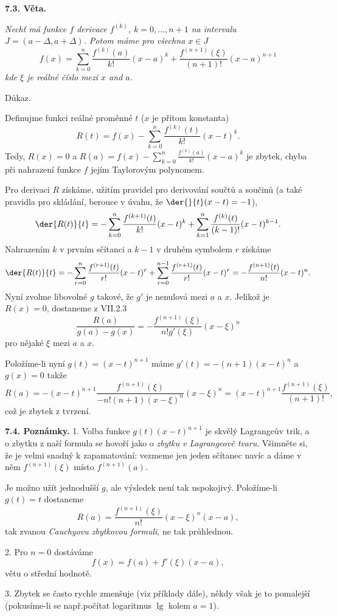 \documentclass[12pt]{article}
\begin{document}
{ \bigskip
 
 {\bf 7.3. Věta.} {\em Nechť má funkce $f$ derivace $f^{(k)}$, $k=0,\dots,n+1$ na intervalu $J=(a-\Delta,a+\Delta)$. Potom máme pro všechna $x\in J$
$$
 f(x)=\sum_{k=0}^n\frac{f^{(k)}(a)}{k!}(x-a)^k+\frac{f^{(n+1)}(\xi)}{(n+1)!}(x-a)^{n+1}
 $$
kde $\xi$ je reálné číslo mezi $x$ and $a$.
 
 Důkaz.} Definujme funkci reálné proměnné $t$ ($x$ je přitom konstanta)
 $$
 R(t)=f(x)-\sum_{k=0}^n\frac{f^{(k)}(t)}{k!}(x-t)^k.
 $$
Tedy, $R(x)=0$  a $R(a)=f(x)-\sum_{k=0}^n\frac{f^{(k)}(a)}{k!}(x-a)^k$
je zbytek, chyba při nahrazení funkce  $f$ jejím Taylorovým polynomem.
 
 Pro derivaci $R$ získáme, užitím pravidel pro derivování součtů a součinů (a také pravidla pro skládání, berouce v úvahu, že $\der{}{t}(x-t)=-1$),
 $$
 \der{R(t)}{t}=-\sum_{k=0}^n\frac{f^{(k+1)}(t)}{k!}(x-t)^k+
 \sum_{k=1}^n\frac{f^{(k)}(t)}{(k-1)!}(x-t)^{k-1}.
  $$
  Nahrazením $k$ v prvním sčítanci  a $k-1$ v druhém
  symbolem $r$ získáme
   $$
 \der{R(t)}{t}=-\sum_{r=0}^n\frac{f^{(r+1)}(t)}{r!}(x-t)^r+
 \sum_{r=0}^{n-1}\frac{f^{(r+1)}(t)}{r!}(x-t)^{r}=-\frac{f^{(n+1)}(t)}{n!}(x-t)^n.
$$
  Nyní zvolme libovolné $g$ takové, že $g'$ je nenulová mezi $a$ a $x$. Jelikož je $R(x)=0$, dostaneme z VII.2.3 
  $$
  \frac{R(a)}{g(a)-g(x)}=-\frac{f^{(n+1)}(\xi)}{n!g'(\xi)}(x-\xi)^n
  $$
 pro nějaké  $\xi$ mezi $a$ a $x$.
  
  Položíme-li nyní $g(t)= (x-t)^{n+1}$ máme $g'(t)=-(n+1)(x-t)^n$ a $g(x)=0$
  takže
  $$
  R(a)=-(x-t)^{n+1}\frac{f^{(n+1)}(\xi)}{-n!(n+1)(x-\xi)^n}(x-\xi)^n=
  (x-t)^{n+1}\frac{f^{(n+1)}(\xi)}{(n+1)!},
  $$
 což je zbytek z tvrzení. \sq
 
 \bigskip
 
 {\bf 7.4. Poznámky.} 1. Volba funkce $g(t)(x-t)^{n+1}$ je skvělý Lagrangeův trik, a o zbytku z naší formula se hovoří jako o {\em zbytku v
  Lagrangeově  tvaru}. Všimněte si, že je velmi snadný k zapamatování: vezmeme jen jeden sčítanec navíc a dáme v něm $f^{(n+1)}(\xi)$ místo $f^{(n+1)}(a)$.
 
 Je možno užít jednodušší $g$, ale výsledek není tak uspokojivý. Položíme-li $g(t)=t$ dostaneme
 $$
 R(a)=\frac{f^{(n+1)}(\xi)}{n!}(x-\xi)^n(x-a),
 $$
tak zvanou {\em Cauchyovu zbytkovou formuli}, ne tak průhlednou.
 
 2. Pro $n=0$ dostáváme 
 $$
 f(x)=f(a)+f'(\xi)(x-a),
 $$ 
 větu o střední hodnotě.
 
3. Zbytek se často rychle zmenšuje (viz příklady dále), někdy však je to pomalejší  (pokusíme-li se např.počítat  logaritmus $\lg$ kolem $a=1$).

}
\end{document}
